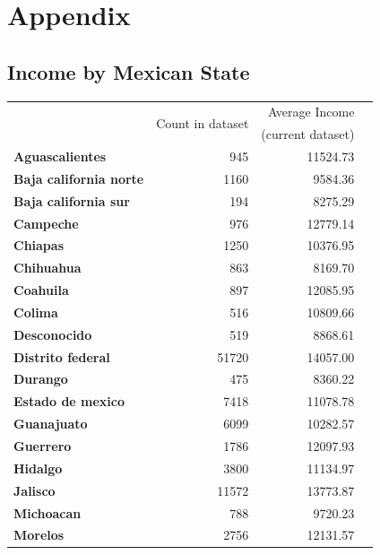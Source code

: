 \appendix
\renewcommand\thefigure{\thesection.\arabic{figure}}
\renewcommand\thetable{\thesection.\arabic{table}}

\setcounter{figure}{0}
\setcounter{table}{0}

\newpage

\section{Appendix}

\subsection{Income by Mexican State}

\begin{table}[!h]
\centering
\begin{tabular}{>{\bfseries}l r r c}
\toprule
\multirow{2}{*}{State} & \multirow{2}{*}{Count in dataset} & Average Income \\
& & (current dataset) \\
\midrule
Aguascalientes & \num{945} & \num{11524.73} \\
Baja california norte & \num{1160} & \num{9584.36} \\
Baja california sur & \num{194} & \num{8275.29} \\
Campeche & \num{976} & \num{12779.14} \\
Chiapas & \num{1250} & \num{10376.95} \\
Chihuahua & \num{863} & \num{8169.70} \\
Coahuila & \num{897} & \num{12085.95} \\
Colima & \num{516} & \num{10809.66} \\
Desconocido & \num{519} & \num{8868.61} \\
Distrito federal & \num{51720} & \num{14057.00} \\
Durango & \num{475} & \num{8360.22} \\
Estado de mexico & \num{7418} & \num{11078.78} \\
Guanajuato & \num{6099} & \num{10282.57} \\
Guerrero & \num{1786} & \num{12097.93} \\
Hidalgo & \num{3800} & \num{11134.97} \\
Jalisco & \num{11572} & \num{13773.87} \\
Michoacan & \num{788} & \num{9720.23} \\
Morelos & \num{2756} & \num{12131.57} \\

\end{tabular}
\end{table}
